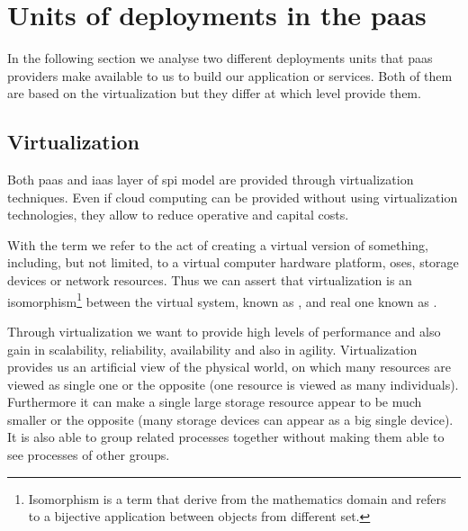 %
%
\section{Units of deployments in the \acs{paas}}
\label{sec:background-deployments}
In the following section we analyse two different deployments units that \ac{paas} providers make
available to us to build our application or services. Both of them are based on the virtualization
but they differ at which level provide them.

\subsection{Virtualization}
\label{sec:background-deployments-virtualization}
Both \ac{paas} and \ac{iaas} layer of \ac{spi} model are provided through virtualization techniques.
Even if cloud computing can be provided without using virtualization technologies, they allow to
reduce operative and capital costs.

With the term  we refer to the act of creating a virtual version of something,
including, but not limited, to a virtual computer hardware platform, \acs{os}es, storage devices or
network resources. Thus we can assert that virtualization is an isomorphism\footnote{Isomorphism is
a term that derive from the mathematics	domain and refers to a bijective application between objects
from different set.} between the virtual system, known as , and real one known as
.

Through virtualization we want to provide high levels of performance and also gain in scalability,
reliability, availability and also in agility. Virtualization provides us an artificial view of the
physical world, on which many resources are viewed as single one or the opposite (one resource
is viewed as many individuals). Furthermore it can make a single large storage resource appear to be much
smaller or the opposite (many storage devices can appear as a big single device). It is also able to group
related processes together without making them able to see processes of other groups.

